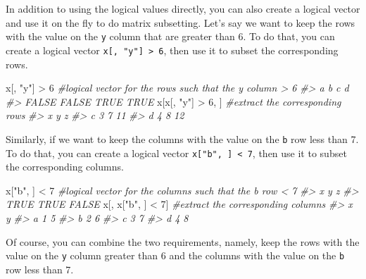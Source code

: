 \documentclass[
]{book}
\newenvironment{Shaded}{\begin{snugshade}}{\end{snugshade}}
\newcommand{\CommentTok}[1]{\textcolor[rgb]{0.56,0.35,0.01}{\textit{#1}}}
\newcommand{\DecValTok}[1]{\textcolor[rgb]{0.00,0.00,0.81}{#1}}
\newcommand{\NormalTok}[1]{#1}
\newcommand{\SpecialCharTok}[1]{\textcolor[rgb]{0.00,0.00,0.00}{#1}}
\newcommand{\StringTok}[1]{\textcolor[rgb]{0.31,0.60,0.02}{#1}}
\begin{document}
In addition to using the logical values directly, you can also create a logical vector and use it on the fly to do matrix subsetting. Let's say we want to keep the rows with the value on the \texttt{y} column that are greater than 6. To do that, you can create a logical vector \texttt{x{[},\ "y"{]}\ \textgreater{}\ 6}, then use it to subset the corresponding rows.

\begin{Shaded}
\begin{Highlighting}[]
\NormalTok{x[, }\StringTok{"y"}\NormalTok{] }\SpecialCharTok{\textgreater{}} \DecValTok{6}       \CommentTok{\#logical vector for the rows such that the \textasciigrave{}y\textasciigrave{} column \textgreater{} 6}
\CommentTok{\#\textgreater{}     a     b     c     d }
\CommentTok{\#\textgreater{} FALSE FALSE  TRUE  TRUE}
\NormalTok{x[x[, }\StringTok{"y"}\NormalTok{] }\SpecialCharTok{\textgreater{}} \DecValTok{6}\NormalTok{, ]  }\CommentTok{\#extract the corresponding rows}
\CommentTok{\#\textgreater{}   x y  z}
\CommentTok{\#\textgreater{} c 3 7 11}
\CommentTok{\#\textgreater{} d 4 8 12}
\end{Highlighting}
\end{Shaded}

Similarly, if we want to keep the columns with the value on the \texttt{b} row less than 7. To do that, you can create a logical vector \texttt{x{[}"b",\ {]}\ \textless{}\ 7}, then use it to subset the corresponding columns.

\begin{Shaded}
\begin{Highlighting}[]
\NormalTok{x[}\StringTok{"b"}\NormalTok{, ] }\SpecialCharTok{\textless{}} \DecValTok{7}       \CommentTok{\#logical vector for the columns such that the \textasciigrave{}b\textasciigrave{} row \textless{} 7}
\CommentTok{\#\textgreater{}     x     y     z }
\CommentTok{\#\textgreater{}  TRUE  TRUE FALSE}
\NormalTok{x[, x[}\StringTok{"b"}\NormalTok{, ] }\SpecialCharTok{\textless{}} \DecValTok{7}\NormalTok{]  }\CommentTok{\#extract the corresponding columns}
\CommentTok{\#\textgreater{}   x y}
\CommentTok{\#\textgreater{} a 1 5}
\CommentTok{\#\textgreater{} b 2 6}
\CommentTok{\#\textgreater{} c 3 7}
\CommentTok{\#\textgreater{} d 4 8}
\end{Highlighting}
\end{Shaded}

Of course, you can combine the two requirements, namely, keep the rows with the value on the \texttt{y} column greater than 6 and the columns with the value on the \texttt{b} row less than 7.
\end{document}
